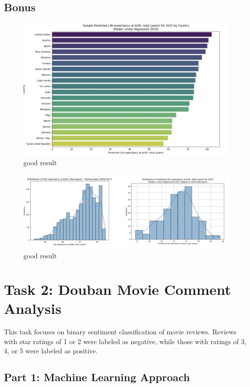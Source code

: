 \documentclass{article}
\begin{document}
\subsection*{Bonus}

\begin{figure}[h]
    \centering
    \includegraphics[width=0.8\columnwidth]{./pic/T1.bonus.1.png} %
    \caption{good result}
    \label{fig:correlation_heatmap3}
\end{figure}

\begin{figure}[h]
    \centering
    \includegraphics[width=0.8\columnwidth]{./pic/T1.bonus.2.png} %
    \caption{good result}
    \label{fig:correlation_heatmap4}
\end{figure}


\section{Task 2: Douban Movie Comment Analysis}
\label{sec:task2}

This task focuses on binary sentiment classification of movie reviews. Reviews with star ratings 
of 1 or 2 were labeled as negative, while those with ratings of 3, 4, or 5 were labeled as positive.

\subsection{Part 1: Machine Learning Approach}
\label{ssec:ml_approach}
\end{document}
